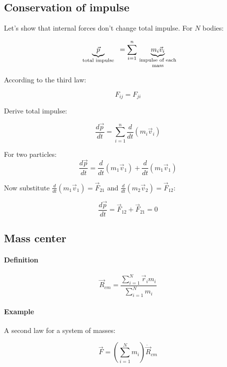  	\subsection{Conservation of impulse}
 	
 	Let's show that internal forces don't change total impulse. For $N$ bodies:
 	
 	$$\underbrace{\vec{p}}_{\parbox{2cm}{\scriptsize \centering total impulse}} = \sum_{i=1}^{n} \underbrace{m_i \vec{v}_i}_{\parbox{2cm}{\scriptsize \centering impulse of each mass}}$$
 	
 	According to the third law:
 	
 	$$F_{ij} = F_{ji}$$
 	
 	Derive total impulse:
 	
 	$$\frac{d\vec{p}}{dt} =  \sum_{i=1}^{n} \frac{d }{dt} \left( m_i \vec{v}_i \right)$$
 	
 	For two particles:
 	$$\frac{d\vec{p}}{dt} =  \frac{d }{dt} \left( m_1 \vec{v}_1 \right) + \frac{d }{dt} \left( m_1 \vec{v}_1 \right)$$
 	
 	Now substitute  $\frac{d }{dt} \left( m_1 \vec{v}_1 \right) =  \vec{F}_{21}$ and   $\frac{d }{dt} \left( m_2 \vec{v}_2 \right) = \vec{F}_{12}$:
 	
 	$$\frac{d\vec{p}}{dt} = \vec{F}_{12} + \vec{F}_{21} = 0$$
 	
 	\subsection{Mass center}
 	\paragraph{Definition}
 	
 	$$\vec{R}_{cm} = \frac{\sum_{i=1}^{N} \vec{r}_i m_i}{\sum_{i=1}^{N} m_i}$$
 	
 	\paragraph{Example} A second law for a system of masses:
 	
 	$$\vec{F} = \left( \sum_{i=1}^{N} m_i \right) \ddot{\vec{R}}_{cm}$$
